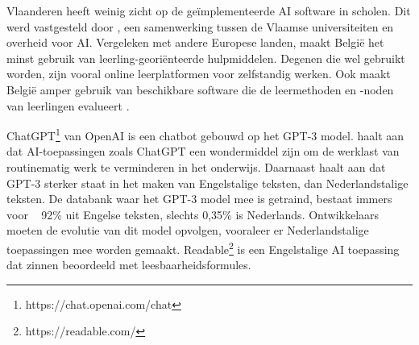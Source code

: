
Vlaanderen heeft weinig zicht op de geïmplementeerde AI software in scholen. Dit werd vastgesteld door \autocite{Martens2021}, een samenwerking tussen de Vlaamse universiteiten en overheid voor AI. Vergeleken met andere Europese landen, maakt België het minst gebruik van leerling-georiënteerde hulpmiddelen. Degenen die wel gebruikt worden, zijn vooral online leerplatformen voor zelfstandig werken. Ook maakt België amper gebruik van beschikbare software die de leermethoden en -noden van leerlingen evalueert \autocite{Martens2021a}. 

ChatGPT\footnote{https://chat.openai.com/chat} van OpenAI is een chatbot gebouwd op het GPT-3 model. \textcite{Verhoeven2023} haalt aan dat AI-toepassingen zoals ChatGPT een wondermiddel zijn om de werklast van routinematig werk te verminderen in het onderwijs. Daarnaast haalt \textcite{Deckmyn2021} aan dat GPT-3 sterker staat in het maken van Engelstalige teksten, dan Nederlandstalige teksten. De databank waar het GPT-3 model mee is getraind, bestaat immers voor ~ 92\% uit Engelse teksten, slechts 0,35\% is Nederlands. Ontwikkelaars moeten de evolutie van dit model opvolgen, vooraleer er Nederlandstalige toepassingen mee worden gemaakt. Readable\footnote{https://readable.com/} is een Engelstalige AI toepassing dat zinnen beoordeeld met leesbaarheidsformules.


